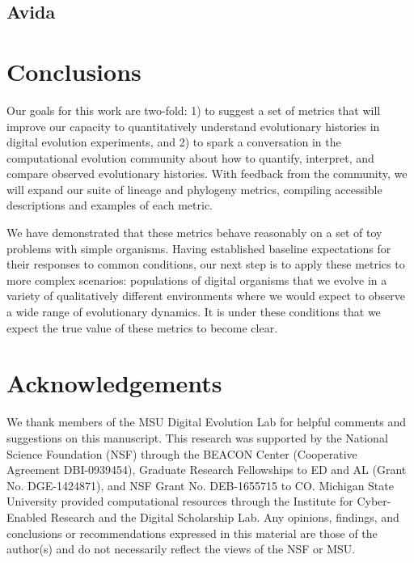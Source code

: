 \documentclass[letterpaper]{article}
\begin{document}
\subsection{Avida}


\section{Conclusions}


Our goals for this work are two-fold: 1) to suggest a set of metrics that will improve our capacity to quantitatively understand evolutionary histories in digital evolution experiments, and 2) to spark a conversation in the computational evolution community about how to quantify, interpret, and compare observed evolutionary histories. With feedback from the community, we will expand our suite of lineage and phylogeny metrics, compiling accessible descriptions and examples of each metric. 

We have demonstrated that %
these metrics behave reasonably on a set of toy problems with simple organisms. Having established baseline expectations for their responses to common conditions, our next step is to apply these metrics to more complex scenarios: populations of digital organisms that we evolve in a variety of qualitatively different environments where we would expect to observe a wide range of evolutionary dynamics. It is under these conditions that we expect the true value of these metrics to become clear.

\section{Acknowledgements}




We thank members of the MSU Digital Evolution Lab for helpful comments and suggestions on this manuscript. This research was supported by the National Science Foundation (NSF) through the BEACON Center (Cooperative Agreement DBI-0939454), Graduate Research Fellowships to ED and AL (Grant No. DGE-1424871), and NSF Grant No. DEB-1655715 to CO. Michigan State University provided computational resources through the Institute for Cyber-Enabled Research and the Digital Scholarship Lab. Any opinions, findings, and conclusions or recommendations expressed in this material are those of the author(s) and do not necessarily reflect the views of the NSF or MSU.

\setlength{\bibsep}{2pt}

\footnotesize

\end{document}
